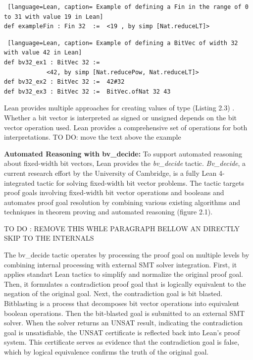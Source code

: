 \begin{lstlisting} [language=Lean, caption= Example of defining a Fin in the range of 0 to 31 with value 19 in Lean]
def exampleFin : Fin 32  :=  <19 , by simp [Nat.reduceLT]>
\end{lstlisting}
\begin{lstlisting} [language=Lean, caption= Example of defining a BitVec of width 32 with value 42 in Lean]
def bv32_ex1 : BitVec 32 :=  
            <42, by simp [Nat.reducePow, Nat.reduceLT]>
def bv32_ex2 : BitVec 32 :=  42#32
def bv32_ex3 : BitVec 32 :=  BitVec.ofNat 32 43 
\end{lstlisting}
 Lean provides multiple approaches for creating values of type  (Listing 2.3) . Whether a bit vector is interpreted as signed or unsigned depends on the bit vector operation used. Lean provides a comprehensive set of operations for both interpretations.
TO DO: move the text above the example 

\textbf{Automated Reasoning with bv\_decide:}
To support automated reasoning about fixed-width bit vectors, Lean provides the \textit{bv\_decide} tactic. \textit{Bv\_decide}, a current research effort by the University of Cambridge, is a fully Lean 4-integrated tactic for solving fixed-width bit vector problems. The tactic targets proof goals involving fixed-width bit vector operations and booleans and automates proof goal resolution by combining various existing algorithms and techniques in theorem proving and automated reasoning (figure 2.1).

TO DO : REMOVE THIS WHLE PARAGRAPH BELLOW AN DIRECTLY SKIP TO THE INTERNALS 

The bv\_decide tactic operates by processing the proof goal on multiple levels by combining internal processing with external  SMT solver integration. First, it applies standart Lean tactics to simplify and normalize the original proof goal. Then, it formulates a contradiction proof goal that is logically equivalent to the negation of the original goal. Next, the contradiction goal is bit blasted. Bitblasting is a process that decomposes bit vector operations into equivalent boolean operations. Then the bit-blasted goal is submitted to an external SMT solver. When the solver returns an UNSAT result, indicating the contradiction goal is unsatisfiable, the UNSAT certificate is reflected back into Lean's proof system. This certificate serves as evidence that the contradiction goal is false, which by logical equivalence confirms the truth of the original goal.

